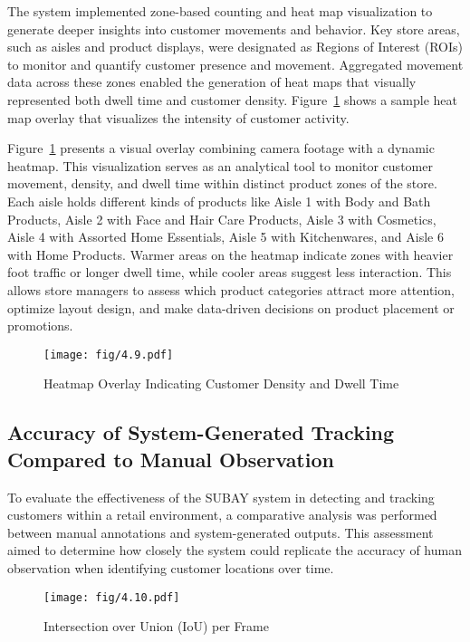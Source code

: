 {The system implemented zone-based counting and heat map visualization to generate deeper insights into customer movements and behavior. Key store areas, such as aisles and product displays, were designated as Regions of Interest (ROIs) to monitor and quantify customer presence and movement. Aggregated movement data across these zones enabled the generation of heat maps that visually represented both dwell time and customer density. Figure~\ref{fig:4.9} shows a sample heat map overlay that visualizes the intensity of customer activity.

Figure~\ref{fig:4.9} presents a visual overlay combining camera footage with a dynamic heatmap. This visualization serves as an analytical tool to monitor customer movement, density, and dwell time within distinct product zones of the store. Each aisle holds different kinds of products like Aisle 1 with Body and Bath Products, Aisle 2 with Face and Hair Care Products, Aisle 3 with Cosmetics, Aisle 4 with Assorted Home Essentials, Aisle 5 with Kitchenwares, and Aisle 6 with Home Products. Warmer areas on the heatmap indicate zones with heavier foot traffic or longer dwell time, while cooler areas suggest less interaction. This allows store managers to assess which product categories attract more attention, optimize layout design, and make data-driven decisions on product placement or promotions.

\begin{figure}[H]
	\caption[Heatmap Overlay Indicating Customer Density and Dwell Time]{\newline \newline Heatmap Overlay Indicating Customer Density and Dwell Time}
	\centering
	\texttt{[image: fig/4.9.pdf]}
	\label{fig:4.9}
\end{figure}

\subsection{Accuracy of System-Generated Tracking Compared to Manual Observation}

To evaluate the effectiveness of the SUBAY system in detecting and tracking customers within a retail environment, a comparative analysis was performed between manual annotations and system-generated outputs. This assessment aimed to determine how closely the system could replicate the accuracy of human observation when identifying customer locations over time.

\begin{figure}[H]
	\caption[Intersection over Union (IoU) per Frame]{\newline \newline Intersection over Union (IoU) per Frame}
	\centering
	\texttt{[image: fig/4.10.pdf]}
	\label{fig:4.10}
\end{figure}

}
